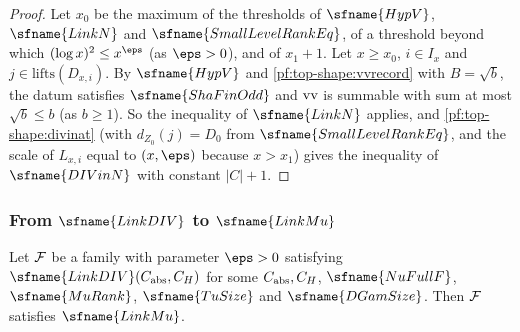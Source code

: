 \begin{proof}
Let $x_0$ be the maximum of the thresholds of $\sfname{HypV}$, $\sfname{LinkN}$ and $\sfname{SmallLevelRankEq}$,
of a threshold beyond which $(\log x)^2\le x^{\eps}$ (as $\eps>0$), and of $x_1+1$. Let $x\ge x_0$, $i\in I_x$
and $j\in\mathrm{lifts}(D_{x,i})$. By $\sfname{HypV}$ and \cref{pf:top-shape:vvrecord} with $B=\sqrt b$, the datum
satisfies $\sfname{ShaFinOdd}$ and $\mathrm{vv}$ is summable with sum at most $\sqrt b\le b$ (as $b\ge1$). So
the inequality of $\sfname{LinkN}$ applies, and \cref{pf:top-shape:divinat} (with $d_{Z_0}(j)=D_0$ from
$\sfname{SmallLevelRankEq}$, and the scale of $L_{x,i}$ equal to $(x,\eps)$ because $x>x_1$) gives the
inequality of $\sfname{DIVinN}$ with constant $|C|+1$.
\end{proof}

\subsubsection*{From $\sfname{LinkDIV}$ to $\sfname{LinkMu}$}

\begin{lemma}\label{pf:top-shape:linkmu}
Let $\mathcal{F}$ be a family with parameter $\eps>0$ satisfying $\sfname{LinkDIV}(C_{\rm abs},C_H)$ for some
$C_{\rm abs},C_H$, $\sfname{NuFullF}$, $\sfname{MuRank}$, $\sfname{TuSize}$ and $\sfname{DGamSize}$. Then
$\mathcal{F}$ satisfies $\sfname{LinkMu}$.
\end{lemma}

